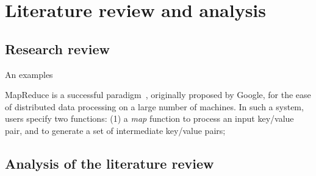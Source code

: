 \chapter{Literature review and analysis}\label{sec-literature}

\section{Research review}
An examples


MapReduce is a successful paradigm~\cite{Dean2008}, originally proposed by Google,
for the ease of distributed data processing on a large number of machines.
In such a system, users specify two functions:
(1) a {\em map} function to process an input key/value pair,
and to generate a set of intermediate key/value pairs;
\section{Analysis of the literature review}
\newpage
